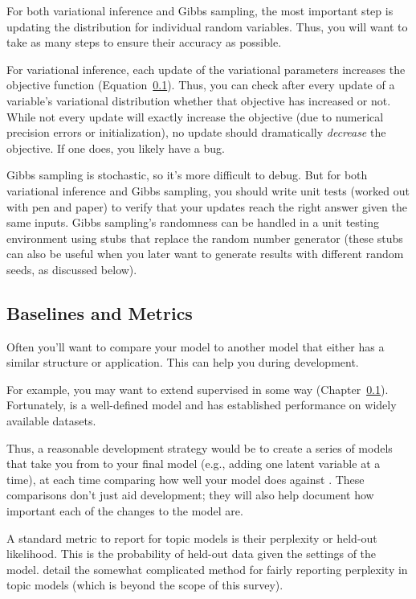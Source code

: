 For both variational inference and Gibbs sampling, the most important
step is updating the distribution for individual random variables.
Thus, you will want to take as many steps to ensure their accuracy as
possible.

For variational inference, each update of the variational parameters
increases the objective function (Equation~\ref{}).  Thus, you can
check after every update of a variable's variational distribution
whether that objective has increased or not.  While not every update
will exactly increase the objective (due to numerical precision errors or
initialization), no update should dramatically \emph{decrease} the
objective.  If one does, you likely have a bug.

Gibbs sampling is stochastic, so it's more difficult to debug.  But
for both variational inference and Gibbs sampling, you should write
unit tests (worked out with pen and paper) to verify that your updates
reach the right answer given the same inputs.  Gibbs sampling's
randomness can be handled in a unit testing environment using stubs
that replace the random number generator (these stubs can also be
useful when you later want to generate results with different random
seeds, as discussed below).

\subsection{Baselines and Metrics}

Often you'll want to compare your model to another model that either
has a similar structure or application.  This can help you during
development.

For example, you may want to extend supervised  in some way
(Chapter~\ref{}).  Fortunately,  is a well-defined model and
has established performance on widely available datasets.

Thus, a reasonable development strategy would be to create a series of
models that take you from  to your final model (e.g., adding
one latent variable at a time), at each time comparing how well your
model does against .  These comparisons don't just aid
development; they will also help document how important each of the
changes to the model are.

A standard metric to report for topic models is their perplexity or
held-out likelihood.  This is the probability of held-out data given
the settings of the model.  \citet{} detail the somewhat complicated
method for fairly reporting perplexity in topic models (which is
beyond the scope of this survey).

